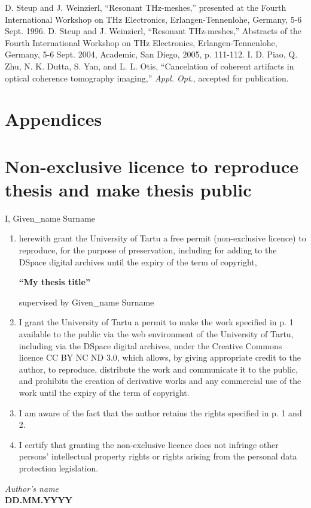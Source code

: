 \documentclass[12pt]{report}
\begin{document}
\begin{thebibliography}{99}
D. Steup and J. Weinzierl, ``Resonant THz-meshes,'' presented at the Fourth International Workshop on THz Electronics, Erlangen-Tennenlohe, Germany, 5-6 Sept. 1996.
D. Steup and J. Weinzierl, ``Resonant THz-meshes,'' Abstracts of the Fourth International Workshop on THz Electronics, Erlangen-Tennenlohe, Germany, 5-6 Sept. 2004, Academic, San Diego, 2005, p. 111-112.
I. D. Piao, Q. Zhu, N. K. Dutta, S. Yan, and L. L. Otis, ``Cancelation of coherent artifacts in optical coherence tomography imaging,'' \textit{Appl. Opt.}, accepted for publication.
\end{thebibliography}
\chapter*{Appendices}
\newpage
\chapter*{Non-exclusive licence to reproduce thesis and make thesis public}
\thispagestyle{empty}
I, Given\_name Surname
\begin{enumerate}
\item herewith grant the University of Tartu a free permit (non-exclusive licence) to reproduce, for the purpose of preservation, including for adding to the DSpace digital archives until the expiry of the term of copyright,
\begin{center}
\textbf{``My thesis title''}
\end{center}
supervised by Given\_name Surname
\item I grant the University of Tartu a permit to make the work specified in p. 1 available to the public via the web environment of the University of Tartu, including via the DSpace digital archives, under the Creative Commons licence CC BY NC ND 3.0, which allows, by giving appropriate credit to the author, to reproduce, distribute the work and communicate it to the public, and prohibits the creation of derivative works and any commercial use of the work until the expiry of the term of copyright. 
\item I am aware of the fact that the author retains the rights specified in p. 1 and 2.
\item I certify that granting the non-exclusive licence does not infringe other persons' intellectual property rights or rights arising from the personal data protection legislation.
\end{enumerate}
\vspace{2cm}
\textit{Author's name}
\\
\textbf{DD.MM.YYYY}
\end{document}

